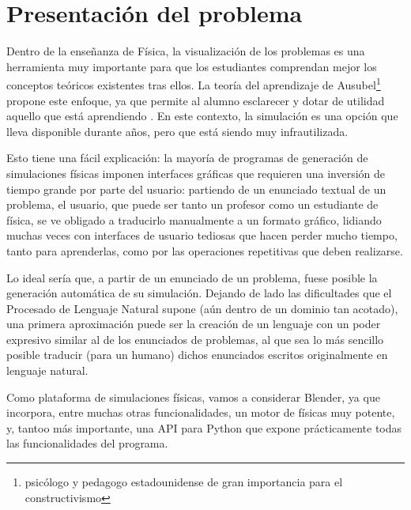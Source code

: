 \documentclass[12pt]{article}
\begin{document}

\tableofcontents
\pagebreak


\section{Presentación del problema}

Dentro de la enseñanza de Física, la visualización de los problemas es una herramienta muy importante para que los estudiantes comprendan mejor los conceptos teóricos existentes tras ellos. La teoría del aprendizaje de Ausubel\footnote{psicólogo y pedagogo estadounidense de gran importancia para el constructivismo} propone este enfoque, ya que permite al alumno esclarecer y dotar de utilidad aquello que está aprendiendo \cite{ausubel1983teoria}. En este contexto, la simulación es una opción que lleva disponible durante años, pero que está siendo muy infrautilizada.

Esto tiene una fácil explicación: la mayoría de programas de generación de simulaciones físicas imponen interfaces gráficas que requieren una inversión de tiempo grande por parte del usuario: partiendo de un enunciado textual de un problema, el usuario, que puede ser tanto un profesor como un estudiante de física, se ve obligado a traducirlo manualmente a un formato gráfico, lidiando muchas veces con interfaces de usuario tediosas que hacen perder mucho tiempo, tanto para aprenderlas, como por las operaciones repetitivas que deben realizarse. 

Lo ideal sería que, a partir de un enunciado de un problema, fuese posible la generación automática de su simulación. Dejando de lado las dificultades que el Procesado de Lenguaje Natural supone (aún dentro de un dominio tan acotado), una primera aproximación puede ser la creación de un lenguaje con un poder expresivo similar al de los enunciados de problemas, al que sea lo más sencillo posible traducir (para un humano) dichos enunciados escritos originalmente en lenguaje natural.

Como plataforma de simulaciones físicas, vamos a considerar Blender, ya que incorpora, entre muchas otras funcionalidades, un motor de físicas muy potente, y, tantoo más importante, una API para Python que expone prácticamente todas las funcionalidades del programa.
\end{document}
